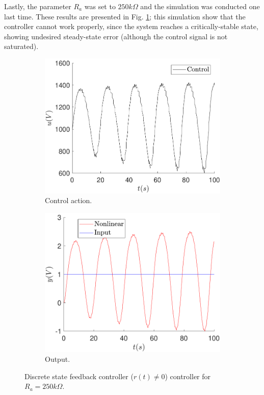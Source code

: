 	Lastly, the parameter $R_a$ was set to $250k\Omega$ and the simulation was conducted one last time. These results are presented in Fig. \ref{fig:sens_ra_250_state_noess}; this simulation show that the controller cannot work properly, since the system reaches a critically-stable state, showing undesired steady-state error (although the control signal is not saturated).
	
	\begin{figure}
        \centering
        \begin{subfigure}[b]{0.475\textwidth}
            \centering
            \includegraphics[scale=0.425]{files/sens_analysis/Ref!0/control_analysis_sfc_a_250_ref_dif_0.pdf}
            \caption{Control action.}
        \end{subfigure}
        \vskip0.1cm
        \begin{subfigure}[b]{0.475\textwidth}   
            \centering 
            \includegraphics[scale=0.425]{files/sens_analysis/Ref!0/analysis_sfc_a_250_ref_dif_0.pdf}
            \caption{Output.}
        \end{subfigure}
        \caption{Discrete state feedback controller ($r(t)\neq0$) controller for $R_a=250k\Omega$.}
        \label{fig:sens_ra_250_state_noess}
	\end{figure}
